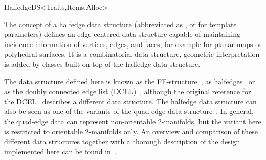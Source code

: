 
\ccRefPageBegin



\begin{ccRefConcept}{HalfedgeDS<Traits,Items,Alloc>}

\ccTagFullDeclarations

\ccDefinition
  
The concept of a halfedge data structure (abbreviated as , or
 for template parameters) defines an edge-centered data structure
capable of maintaining incidence information of vertices, edges, and
faces, for example for planar maps or polyhedral surfaces. It is a
combinatorial data structure, geometric interpretation is added by
classes built on top of the halfedge data structure. 

The data structure defined here is known as the
FE-structure~\cite{w-ebdss-85}, as
halfedges~\cite{m-ism-88,cgal:bfh-mgedm-95} or as the doubly connected edge
list (DCEL)~\cite{bkos-cgaa-97}, although the original reference for
the DCEL~\cite{mp-fitcp-78} describes a different data structure. The
halfedge data structure can also be seen as one of the variants of the
quad-edge data structure~\cite{gs-pmgsc-85}. In general, the quad-edge
data can represent non-orientable 2-manifolds, but the variant here is
restricted to orientable 2-manifolds only. An overview and comparison
of these different data structures together with a thorough
description of the design implemented here can be found
in~\cite{k-ugpdd-99}.


\end{ccRefConcept}
